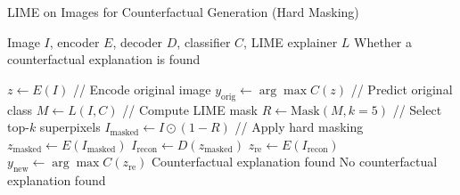 \begin{algorithm}[htbp]
\caption{LIME on Images for Counterfactual Generation (Hard Masking)}
\label{alg:lime_on_images}
\begin{algorithmic}[1]
\REQUIRE Image $I$, encoder $E$, decoder $D$, classifier $C$, LIME explainer $L$
\ENSURE Whether a counterfactual explanation is found

\STATE $z \leftarrow E(I)$ \hfill // Encode original image
\STATE $y_{\text{orig}} \leftarrow \arg\max C(z)$ \hfill // Predict original class
\STATE $M \leftarrow L(I, C)$ \hfill // Compute LIME mask
\STATE $R \leftarrow \text{Mask}(M, k=5)$ \hfill // Select top-$k$ superpixels
\STATE $I_{\text{masked}} \leftarrow I \odot (1 - R)$ \hfill // Apply hard masking
\STATE $z_{\text{masked}} \leftarrow E(I_{\text{masked}})$
\STATE $I_{\text{recon}} \leftarrow D(z_{\text{masked}})$
\STATE $z_{\text{re}} \leftarrow E(I_{\text{recon}})$
\STATE $y_{\text{new}} \leftarrow \arg\max C(z_{\text{re}})$
    \RETURN Counterfactual explanation found
\ENDIF
\RETURN No counterfactual explanation found
\end{algorithmic}
\end{algorithm}

